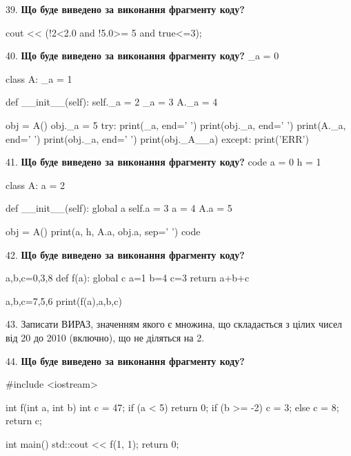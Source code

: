 \documentclass[11pt]{article}
\begin{document}
39. \textbf{Що буде виведено за виконання фрагменту коду?}

cout << (!2<2.0 and !5.0>= 5 and true<=3);
\par\vspace{5mm}

40. \textbf{Що буде виведено за виконання фрагменту коду?}
_a = 0

class A:
    _a = 1
    
    def __init__(self):
        self._a = 2
        _a = 3
        A._a = 4

obj = A()
obj._a = 5
try:
    print(_a, end=' ')
    print(obj._a, end=' ')
    print(A._a, end=' ')
    print(obj._a, end=' ')
    print(obj._A__a)
except:
    print('ERR')
\par\vspace{5mm}

41. \textbf{Що буде виведено за виконання фрагменту коду?}
code
a = 0
h = 1

class A:
    a = 2
    
    def __init__(self):
global a        self.a = 3
        a = 4
        A.a = 5

obj = A()
print(a, h, A.a, obj.a, sep=' ')
code
\par\vspace{5mm}

42. \textbf{Що буде виведено за виконання фрагменту коду?}

a,b,c=0,3,8
def f(a):
global c    a=1
    b=4
    c=3
    return a+b+c

a,b,c=7,5,6
print(f(a),a,b,c)
\par\vspace{5mm}

43. 
Записати ВИРАЗ, значенням якого є множина, що складається з цілих чисел від 20 до 2010 (включно), що не діляться на 2.\par\vspace{5mm}

44. \textbf{Що буде виведено за виконання фрагменту коду?}

#include <iostream>

int f(int a, int b){
    int c = 47;
    if (a < 5)
        return 0;
    if (b >= -2)
         c = 3;
    else 
        c = 8;
    return c;
}

int main(){
    std::cout << f(1, 1);
    return 0;
}
\par\vspace{5mm}
\end{document}
